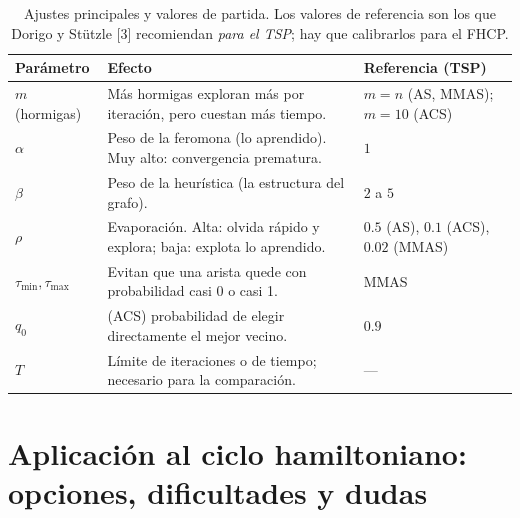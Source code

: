 \documentclass[11pt,letterpaper]{article}
\theoremstyle{definition}
\begin{document}
\begin{table}[H]
\centering
\caption{Ajustes principales y valores de partida. Los valores de referencia son los que
Dorigo y Stützle [3] recomiendan \emph{para el TSP}; hay que calibrarlos para el FHCP.}
\label{tab:params}
\begin{tabular}{@{}p{2.7cm}p{6.9cm}p{4.4cm}@{}}
\toprule
Parámetro & Efecto & Referencia (TSP) \\
\midrule
$m$ (hormigas) & Más hormigas exploran más por iteración, pero cuestan más tiempo.
               & $m=n$ (AS, MMAS); $m=10$ (ACS) \\
$\alpha$ & Peso de la feromona (lo aprendido). Muy alto: convergencia prematura. & $1$ \\
$\beta$  & Peso de la heurística (la estructura del grafo). & $2$ a $5$ \\
$\rho$   & Evaporación. Alta: olvida rápido y explora; baja: explota lo aprendido.
         & $0.5$ (AS), $0.1$ (ACS), $0.02$ (MMAS) \\
$\tau_{\min},\tau_{\max}$ & Evitan que una arista quede con probabilidad casi 0 o casi 1. & MMAS \\
$q_0$    & (ACS) probabilidad de elegir directamente el mejor vecino. & $0.9$ \\
$T$      & Límite de iteraciones o de tiempo; necesario para la comparación. & ---\\
\bottomrule
\end{tabular}
\end{table}

\section{Aplicación al ciclo hamiltoniano: opciones, dificultades y dudas}
\end{document}
